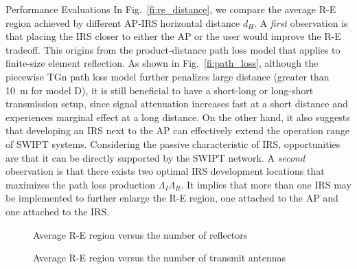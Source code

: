 \documentclass[journal]{IEEEtran}
\begin{document}
\begin{section}{Performance Evaluations}
		In Fig.~\ref{fi:re_distance}, we compare the average R-E region achieved by different AP-IRS horizontal distance $d_H$. A \textit{first} observation is that placing the IRS closer to either the AP or the user would improve the R-E tradeoff. This origins from the product-distance path loss model that applies to finite-size element reflection. As shown in Fig.~\ref{fi:path_loss}, although the piecewise TGn path loss model further penalizes large distance (greater than \SI{10}{\meter} for model D), it is still beneficial to have a short-long or long-short transmission setup, since signal attenuation increases fast at a short distance and experiences marginal effect at a long distance. On the other hand, it also suggests that developing an IRS next to the AP can effectively extend the operation range of SWIPT systems. Considering the passive characteristic of IRS, opportunities are that it can be directly supported by the SWIPT network. A \textit{second} observation is that there exists two optimal IRS development locations that maximizes the path loss production $\Lambda_I\Lambda_R$. It implies that more than one IRS may be implemented to further enlarge the R-E region, one attached to the AP and one attached to the IRS.

		\begin{figure}[!t]
			\centering
			\begin{adjustbox}{width=\linewidth}
				
			\end{adjustbox}
			\caption{Average R-E region versus the number of reflectors}
			\label{fi:re_reflector}
		\end{figure}

		\begin{figure}[!t]
			\centering
			\begin{adjustbox}{width=\linewidth}
				
			\end{adjustbox}
			\caption{Average R-E region versus the number of transmit antennas}
			\label{fi:re_tx}
		\end{figure}


\end{section}
\end{document}
